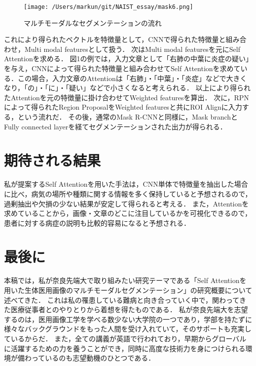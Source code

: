 \documentclass[a4j,10pt,twocolumn]{jarticle}
\begin{document}
\begin{figure}[ht]%
    \texttt{[image: /Users/markun/git/NAIST\_essay/mask6.png]}
    \caption{マルチモーダルなセグメンテーションの流れ}
\end{figure}

これにより得られたベクトルを特徴量として，CNNで得られた特徴量と組み合わせ，Multi modal featuresとして扱う．
次はMulti modal featuresを元にSelf Attentionを求める．
図1の例では，入力文章として「右肺の中葉に炎症の疑い」を与え，CNNによって得られた特徴量と組み合わせてSelf Attentionを求めている．この場合，入力文章のAttentionは「右肺」・「中葉」・「炎症」などで大きくなり，「の」・「に」・「疑い」などで小さくなると考えられる．
以上により得られたAttentionを元の特徴量に掛け合わせてWeighted featuresを算出．
次に，RPN\cite{ren2015faster}によって得られたRegion ProposalをWeighted featuresと共にROI Alignに入力する，という流れだ．
その後，通常のMask R-CNNと同様に，Mask branchとFully connected layerを経てセグメンテーションされた出力が得られる．
\section{期待される結果}
私が提案するSelf Attentionを用いた手法は，CNN単体で特徴量を抽出した場合に比べ，病気の場所や種類に関する情報を多く保持していると予想されるので，過剰抽出や欠損の少ない結果が安定して得られると考える．
また，Attentionを求めていることから，画像・文章のどこに注目しているかを可視化できるので，患者に対する病症の説明も比較的容易になると予想される．

\section{最後に}
本稿では，私が奈良先端大で取り組みたい研究テーマである「Self Attentionを用いた生体医用画像のマルチモーダルセグメンテーション」の研究概要について述べてきた．
これは私の罹患している難病と向き合っていく中で，関わってきた医療従事者とのやりとりから着想を得たものである．
私が奈良先端大を志望するのは，医用画像工学を学べる数少ない大学院の一つであり，学部を持たずに様々なバックグラウンドをもった人間を受け入れていて，そのサポートも充実しているからだ．
また，全ての講義が英語で行われており，早期からグローバルに活躍するための力を養うことができ，同時に高度な技術力を身につけられる環境が備わっているのも志望動機のひとつである．



\end{document}
